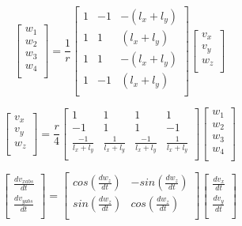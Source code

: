 \begin{equation}
\begin{bmatrix}
w_1\\
w_2\\
w_3\\
w_4\\
\end{bmatrix}
= \frac{1}{r}
\begin{bmatrix}
1 & -1 & -(l_x + l_y) \\
1 & 1 & (l_x + l_y) \\
1 & 1 & -(l_x + l_y) \\
1 & -1 & (l_x + l_y) \\
\end{bmatrix}
\begin{bmatrix}
v_x \\
v_y \\
w_z \\
\end{bmatrix}
\label{E:kinematica_inversa}
\end{equation}

\begin{equation}
\begin{bmatrix}
v_x \\
v_y \\
w_z \\
\end{bmatrix}
= \frac{r}{4}
\begin{bmatrix}
1 & 1 & 1 & 1 \\
-1 & 1 & 1 & -1 \\
\frac{-1}{l_x + l_y} & \frac{1}{l_x + l_y} & \frac{-1}{l_x + l_y} & \frac{1}{l_x + l_y} \\
\end{bmatrix}
\begin{bmatrix}
w_1\\
w_2\\
w_3\\
w_4\\
\label{E:kinematica_directa}
\end{bmatrix}
\end{equation}

\begin{equation}
\begin{bmatrix}
\frac{d v_{x abs}}{dt} \\
\frac{d v_{y abs}}{dt} \\
\end{bmatrix}
 =
\begin{bmatrix}
cos(\frac{d w_z}{d t}) & -sin(\frac{d w_z}{d t}) \\
sin(\frac{d w_z}{d t}) & cos(\frac{d w_z}{d t}) \\
\end{bmatrix}
\begin{bmatrix}
\frac{d v_x}{dt} \\
\frac{d v_y}{dt} \\
\end{bmatrix}
\label{E:transformación}
\end{equation}

